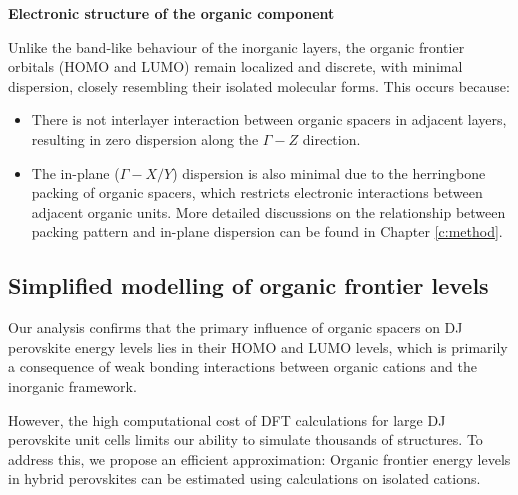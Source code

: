 \textbf{Electronic structure of the organic component}

Unlike the band-like behaviour of the inorganic layers, the organic frontier orbitals (HOMO and LUMO) remain localized and discrete, with minimal dispersion, closely resembling their isolated molecular forms. This occurs because:
\begin{itemize}
    \item There is not interlayer interaction between organic spacers in adjacent layers, resulting in zero dispersion along the $\Gamma-Z$ direction. 
    \item The in-plane ($\Gamma-X/Y$) dispersion is also minimal due to the herringbone packing of organic spacers, which restricts electronic interactions between adjacent organic units. More detailed discussions on the relationship between packing pattern and in-plane dispersion can be found in Chapter \ref{c:method}.
\end{itemize}

\subsection{Simplified modelling of organic frontier levels}

Our analysis confirms that the primary influence of organic spacers on DJ perovskite energy levels lies in their HOMO and LUMO levels, which is primarily a consequence of weak bonding interactions between organic cations and the inorganic framework\cite{RN42,RN144}. 

However, the high computational cost of DFT calculations for large DJ perovskite unit cells limits our ability to simulate thousands of structures. To address this, we propose an efficient approximation: Organic frontier energy levels in hybrid perovskites can be estimated using calculations on isolated cations.

